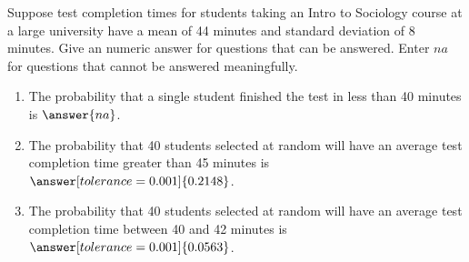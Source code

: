 \documentclass{ximera}
\begin{document}
\begin{problem}\label{prob:exam2prob8}
Suppose test completion times for students taking an Intro to Sociology course at a large university have a mean of 44 minutes and standard deviation of 8 minutes.  Give an numeric answer for questions that can be answered.  Enter $na$ for questions that cannot be answered meaningfully.
\begin{enumerate}
\item The probability that a single student finished the test in less than 40 minutes is $\answer{na}$.
\item The probability that 40 students selected at random will have an average test completion time greater than 45 minutes is $\answer[tolerance=0.001]{0.2148}$.
\item The probability that 40 students selected at random will have an average test completion time between 40 and 42 minutes is $\answer[tolerance=0.001]{0.0563}$.
\end{enumerate}
\end{problem}
\end{document}
